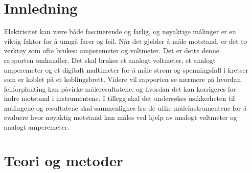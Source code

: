\documentclass[twocolumn, a4paper, 11pt]{article} %
\begin{document}

\section{Innledning} 
Elektrisitet kan være både fascinerende og farlig, og nøyaktige målinger er en viktig faktor for å unngå farer og feil. Når det gjelder å måle motstand, er det to verktøy som ofte brukes: amperemeter og voltmeter. Det er dette denne rapporten omhandler. Det skal brukes et analogt voltmeter, et analogt amperemeter og et digitalt multimeter for å måle strøm og spenningsfall i kretser som er koblet på et koblingsbrett. Videre vil rapporten se nærmere på hvordan feilforplanting kan påvirke måleresultatene, og hvordan det kan korrigeres for indre motstand i instrumentene. I tillegg skal det undersøkes usikkerheten til målingene og resultatene skal sammenlignes fra de ulike måleinstrumentene for å evaluere hvor nøyaktig motstand kan måles ved hjelp av analogt voltmeter og analogt amperemeter.


\section{Teori og metoder}
\end{document}
